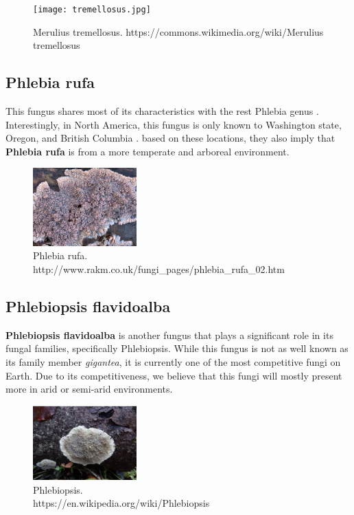 \documentclass[12pt]{article}
\begin{document}
\begin{figure}[h!]
\begin{center}
\texttt{[image: tremellosus.jpg]}
\caption{Merulius tremellosus. \centering
https://commons.wikimedia.org/wiki/Merulius tremellosus}
\end{center}
\end{figure}

\subsection{Phlebia rufa}

This fungus shares most of its characteristics with the rest Phlebia genus \cite{Phlebia}. Interestingly, in North America, this fungus is only known to Washington state, Oregon, and British Columbia \cite{Phlebia2}. based on these locations, they also imply that \textbf{Phlebia rufa} is from a more temperate and arboreal environment. 

\begin{figure}[h!]
\begin{center}
\includegraphics[width=4cm]{rufa.jpg}
\caption{Phlebia rufa. \centering
http://www.rakm.co.uk/fungi\_pages/phlebia\_rufa\_02.htm}
\end{center}
\end{figure}

\subsection{Phlebiopsis flavidoalba}
\textbf{Phlebiopsis flavidoalba} is another fungus that plays a significant role in its fungal families, specifically Phlebiopsis. While this fungus is not as well known as its family member \textit{gigantea}, it is currently one of the most competitive fungi on Earth. Due to its competitiveness, we believe that this fungi will mostly present more in arid or semi-arid environments.

\begin{figure}[h!]
\begin{center}
\includegraphics[width=4cm]{phlebio.png}
\caption{Phlebiopsis. \\ https://en.wikipedia.org/wiki/Phlebiopsis}
\end{center}
\end{figure}
\end{document}
